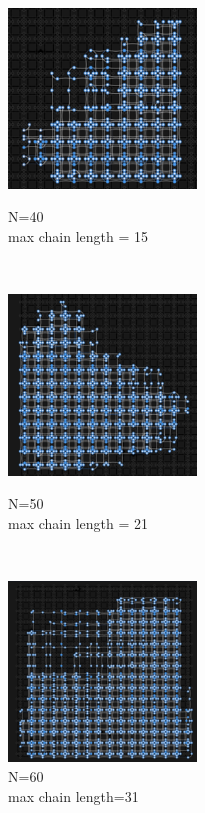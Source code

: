 \documentclass[oneside,a4paper]{article}
\begin{document}
\begin{figure}[htp]
\begin{minipage}[b]{4.5cm}
\centering
\includegraphics[width=5cm]{LaTeXTemplate/Images/2000Qfirst40.png}
\caption{N=40\\max chain length = 15}
\end{minipage}
\ \hspace{2mm} \hspace{2mm} \
\begin{minipage}[b]{4.5cm}
\centering
\includegraphics[width=5cm]{LaTeXTemplate/Images/2000Qfirst50.png}
\caption{N=50\\max chain length = 21}
\end{minipage}
\ \hspace{2mm} \hspace{2mm} \
\begin{minipage}[b]{4.5cm}
\centering
\includegraphics[width=5cm]{LaTeXTemplate/Images/2000Qfirst60.png}
\caption{N=60\\max chain length=31}
\end{minipage}
\end{figure}
\end{document}
